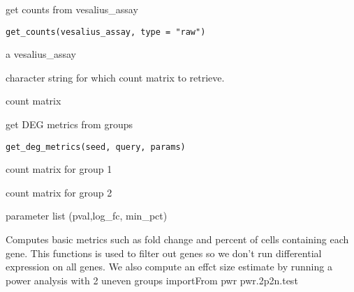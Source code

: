 \documentclass[a4paper]{book}
\begin{document}
%
\begin{Description}
get counts from vesalius\_assay
\end{Description}
%
\begin{Usage}
\begin{verbatim}
get_counts(vesalius_assay, type = "raw")
\end{verbatim}
\end{Usage}
%
\begin{Arguments}
\begin{ldescription}
\item[\code{vesalius\_assay}] a vesalius\_assay

\item[\code{type}] character string for which count matrix to
retrieve.
\end{ldescription}
\end{Arguments}
%
\begin{Value}
count matrix
\end{Value}
%
\begin{Description}
get DEG metrics from groups
\end{Description}
%
\begin{Usage}
\begin{verbatim}
get_deg_metrics(seed, query, params)
\end{verbatim}
\end{Usage}
%
\begin{Arguments}
\begin{ldescription}
\item[\code{seed}] count matrix for group 1

\item[\code{query}] count matrix for group 2

\item[\code{params}] parameter list (pval,log\_fc, min\_pct)
\end{ldescription}
\end{Arguments}
%
\begin{Details}
Computes basic metrics such as fold change 
and percent of cells containing each gene. This functions 
is used to filter out genes so we don't run differential 
expression on all genes. We also compute an effct size estimate 
by running a power analysis with 2 uneven groups 
importFrom pwr pwr.2p2n.test
\end{Details}
\end{document}
